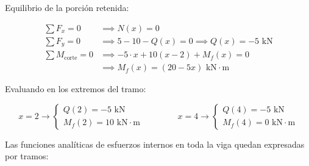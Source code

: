\begin{center}
\begin{minipage}{0.48\textwidth}
\begin{tikzpicture}[scale=0.9, >=Latex]
        \end{tikzpicture}

    \end{minipage}\hfill

    \begin{minipage}{0.48\textwidth}

        Equilibrio de la porción retenida:

        \begin{align*}

            \sum F_x = 0              & \implies N(x) = 0                                       \\

            \sum F_y = 0              & \implies 5 - 10 - Q(x) = 0 \implies Q(x) = -5\text{ kN} \\

            \sum M_{\text{corte}} = 0 & \implies -5 \cdot x + 10(x-2) + M_f(x) = 0              \\

                                      & \implies M_f(x) = (20 - 5x)\text{ kN}\cdot\text{m}

        \end{align*}

    \end{minipage}

\end{center}



Evaluando en los extremos del tramo:

\begin{equation}

    x = 2 \longrightarrow \begin{cases} Q(2) = -5\text{ kN} \\ M_f(2) = 10\text{ kN}\cdot\text{m} \end{cases}

    \qquad\qquad

    x = 4 \longrightarrow \begin{cases} Q(4) = -5\text{ kN} \\ M_f(4) = 0\text{ kN}\cdot\text{m} \end{cases}

\end{equation}






Las funciones analíticas de esfuerzos internos en toda la viga quedan expresadas por tramos:


